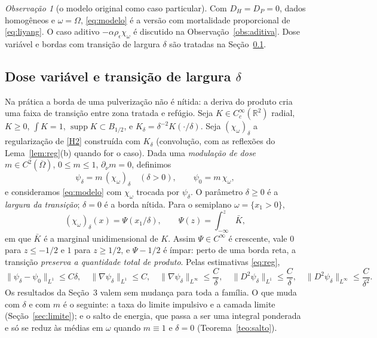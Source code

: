 \documentclass[11pt,a4paper]{article}
\numberwithin{equation}{section}
\theoremstyle{definition}
\theoremstyle{remark}
\newtheorem{observacao}[teorema]{Observação}
\newcommand{\R}{\mathbb{R}}
\begin{document}
\begin{observacao}[o modelo original como caso particular]
Com $D_H=D_P=0$, dados homogêneos e $\omega=\Omega$, \eqref{eq:modelo} é a versão com mortalidade
proporcional de \eqref{eq:liyang}. O caso aditivo $-\alpha\rho_\epsilon\chi_\omega$ é discutido na
Observação~\ref{obs:aditiva}. Dose variável e bordas com transição de largura $\delta$ são
tratadas na Seção~\ref{sec:delta}.
\end{observacao}

\subsection{Dose variável e transição de largura $\delta$}\label{sec:delta}

Na prática a borda de uma pulverização não é nítida: a deriva do produto cria uma faixa de
transição entre zona tratada e refúgio. Seja $K\in C^\infty_c(\R^2)$ radial, $K\ge0$, $\int K=1$,
$\operatorname{supp}K\subset B_{1/2}$, e $K_\delta=\delta^{-2}K(\cdot/\delta)$. Seja $(\chi_\omega)_\delta$ a
regularização de \ref{H2} construída com $K_\delta$ (convolução, com as reflexões do Lema~\ref{lem:reg}(b)
quando for o caso). Dada uma \emph{modulação de dose} $m\in C^2(\overline\Omega)$, $0\le m\le1$,
$\partial_\nu m=0$, definimos
\begin{equation}\label{eq:psidelta}
\psi_\delta=m\,(\chi_\omega)_\delta\quad(\delta>0),\qquad \psi_0=m\,\chi_\omega,
\end{equation}
e consideramos \eqref{eq:modelo} com $\chi_\omega$ trocada por $\psi_\delta$. O parâmetro $\delta\ge0$ é a
\emph{largura da transição}; $\delta=0$ é a borda nítida. Para o semiplano $\omega=\{x_1>0\}$,
\[
(\chi_\omega)_\delta(x)=\Psi(x_1/\delta),\qquad \Psi(z)=\int_{-\infty}^z\bar K,
\]
em que $\bar K$ é a marginal unidimensional de $K$. Assim $\Psi\in C^\infty$ é crescente, vale $0$ para
$z\le-1/2$ e $1$ para $z\ge1/2$, e $\Psi-1/2$ é ímpar: perto de uma borda reta, a transição
\emph{preserva a quantidade total de produto}. Pelas estimativas \eqref{eq:reg},
\begin{equation}\label{eq:regdelta}
\|\psi_\delta-\psi_0\|_{L^1}\le C\delta,\quad \|\nabla\psi_\delta\|_{L^1}\le C,\quad
\|\nabla\psi_\delta\|_{L^\infty}\le\frac C\delta,\quad \|D^2\psi_\delta\|_{L^1}\le\frac C\delta,\quad
\|D^2\psi_\delta\|_{L^\infty}\le\frac C{\delta^2}.
\end{equation}
Os resultados da Seção~3 valem sem mudança para toda a família. O que muda com $\delta$ e com $m$ é
o seguinte: a taxa do limite impulsivo e a camada limite (Seção~\ref{sec:limite}); e o salto de
energia, que passa a ser uma integral ponderada e só se reduz às médias em $\omega$ quando $m\equiv1$ e
$\delta=0$ (Teorema~\ref{teo:salto}).
\end{document}

